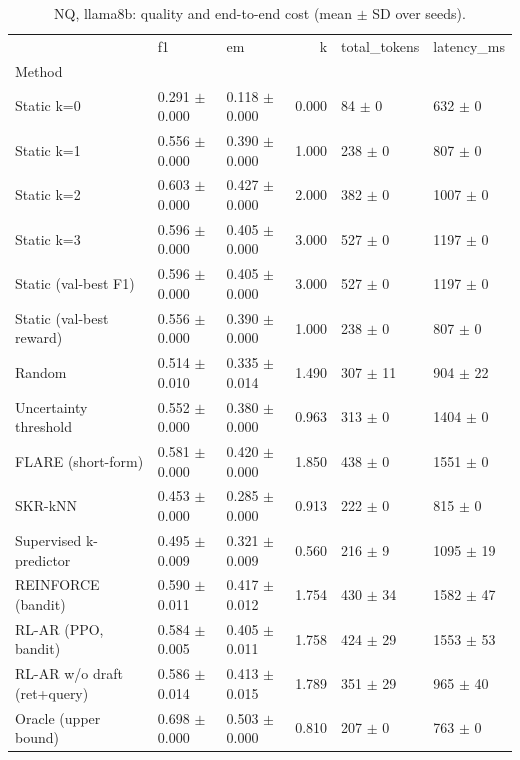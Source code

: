 \begin{table}
\caption{NQ, llama8b: quality and end-to-end cost (mean $\pm$ SD over seeds).}
\begin{tabular}{lllrll}
\toprule
 & f1 & em & k & total_tokens & latency_ms \\
Method &  &  &  &  &  \\
\midrule
Static k=0 & 0.291 $\pm$ 0.000 & 0.118 $\pm$ 0.000 & 0.000 & 84 $\pm$ 0 & 632 $\pm$ 0 \\
Static k=1 & 0.556 $\pm$ 0.000 & 0.390 $\pm$ 0.000 & 1.000 & 238 $\pm$ 0 & 807 $\pm$ 0 \\
Static k=2 & 0.603 $\pm$ 0.000 & 0.427 $\pm$ 0.000 & 2.000 & 382 $\pm$ 0 & 1007 $\pm$ 0 \\
Static k=3 & 0.596 $\pm$ 0.000 & 0.405 $\pm$ 0.000 & 3.000 & 527 $\pm$ 0 & 1197 $\pm$ 0 \\
Static (val-best F1) & 0.596 $\pm$ 0.000 & 0.405 $\pm$ 0.000 & 3.000 & 527 $\pm$ 0 & 1197 $\pm$ 0 \\
Static (val-best reward) & 0.556 $\pm$ 0.000 & 0.390 $\pm$ 0.000 & 1.000 & 238 $\pm$ 0 & 807 $\pm$ 0 \\
Random & 0.514 $\pm$ 0.010 & 0.335 $\pm$ 0.014 & 1.490 & 307 $\pm$ 11 & 904 $\pm$ 22 \\
Uncertainty threshold & 0.552 $\pm$ 0.000 & 0.380 $\pm$ 0.000 & 0.963 & 313 $\pm$ 0 & 1404 $\pm$ 0 \\
FLARE (short-form) & 0.581 $\pm$ 0.000 & 0.420 $\pm$ 0.000 & 1.850 & 438 $\pm$ 0 & 1551 $\pm$ 0 \\
SKR-kNN & 0.453 $\pm$ 0.000 & 0.285 $\pm$ 0.000 & 0.913 & 222 $\pm$ 0 & 815 $\pm$ 0 \\
Supervised k-predictor & 0.495 $\pm$ 0.009 & 0.321 $\pm$ 0.009 & 0.560 & 216 $\pm$ 9 & 1095 $\pm$ 19 \\
REINFORCE (bandit) & 0.590 $\pm$ 0.011 & 0.417 $\pm$ 0.012 & 1.754 & 430 $\pm$ 34 & 1582 $\pm$ 47 \\
RL-AR (PPO, bandit) & 0.584 $\pm$ 0.005 & 0.405 $\pm$ 0.011 & 1.758 & 424 $\pm$ 29 & 1553 $\pm$ 53 \\
RL-AR w/o draft (ret+query) & 0.586 $\pm$ 0.014 & 0.413 $\pm$ 0.015 & 1.789 & 351 $\pm$ 29 & 965 $\pm$ 40 \\
Oracle (upper bound) & 0.698 $\pm$ 0.000 & 0.503 $\pm$ 0.000 & 0.810 & 207 $\pm$ 0 & 763 $\pm$ 0 \\
\bottomrule
\end{tabular}
\end{table}
